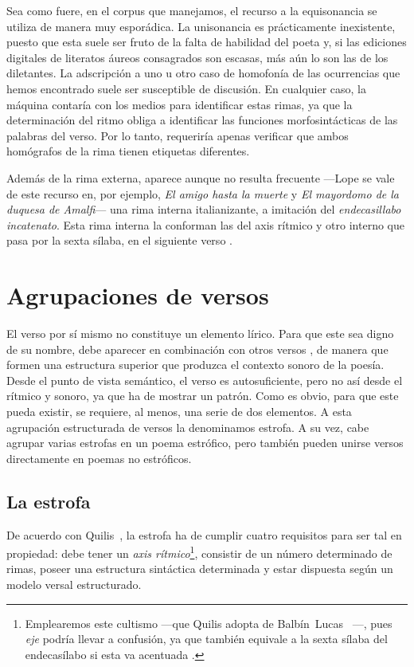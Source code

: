 Sea como fuere, en el corpus que manejamos, el recurso a la equisonancia se utiliza de manera muy esporádica. La unisonancia es prácticamente inexistente, puesto que esta suele ser fruto de la falta de habilidad del poeta y, si las ediciones digitales de literatos áureos consagrados son escasas, más aún lo son las de los diletantes. La adscripción a uno u otro caso de homofonía de las ocurrencias que hemos encontrado suele ser susceptible de discusión. En cualquier caso, la máquina contaría con los medios para identificar estas rimas, ya que la determinación del ritmo obliga a identificar las funciones morfosintácticas de las palabras del verso. Por lo tanto, requeriría apenas verificar que ambos homógrafos de la rima tienen etiquetas diferentes.

Además de la rima externa, aparece aunque no resulta frecuente —Lope se vale de este recurso en, por ejemplo, \textit{El amigo hasta la muerte} y \textit{El mayordomo de la duquesa de Amalfi}— una rima interna italianizante, a imitación del \textit{endecasillabo incatenato}. Esta rima interna la conforman las del axis rítmico y otro interno que pasa por la sexta sílaba, en el siguiente verso \parencite{sanchez2014}. 

\section{Agrupaciones de versos}
El verso por sí mismo no constituye un elemento lírico. Para que este sea digno de su nombre, debe aparecer en combinación con otros versos \parencite[95]{quilis2013}, de manera que formen una estructura superior que produzca el contexto sonoro de la poesía. Desde el punto de vista semántico, el verso es autosuficiente, pero no así desde el rítmico y sonoro, ya que ha de mostrar un patrón. Como es obvio, para que este pueda existir, se requiere, al menos, una serie de dos elementos. A esta agrupación estructurada de versos la denominamos estrofa. A su vez, cabe agrupar varias estrofas en un poema estrófico, pero también pueden unirse versos directamente en poemas no estróficos.

\subsection{La estrofa}
De acuerdo con Quilis~\parencite*[95-99]{quilis2013}, la estrofa ha de cumplir cuatro requisitos para ser tal en propiedad: debe tener un \textit{axis rítmico}\footnote{Emplearemos este cultismo —que Quilis adopta de Balbín~Lucas~\parencite*{balbin1968} —, pues \textit{eje}  podría llevar  a confusión, ya que también equivale a la sexta sílaba del endecasílabo si esta va acentuada \parencite[][\textit{s.v.} \textit{eje}]{dominguez1985}.}, consistir de un número determinado de rimas, poseer una estructura sintáctica determinada y estar dispuesta según un modelo versal estructurado.

